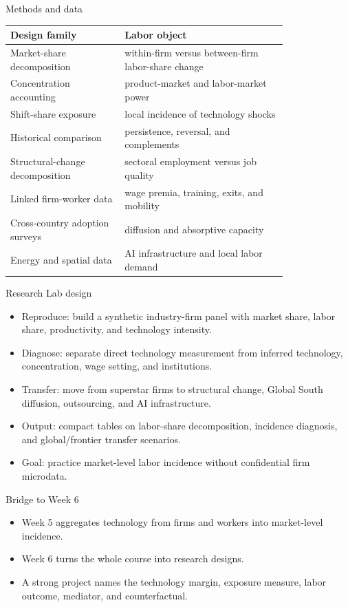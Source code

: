\documentclass[aspectratio=169,11pt]{beamer}
\begin{document}
\begin{frame}{Methods and data}
\small
\begin{tabular}{p{0.33\linewidth} p{0.47\linewidth}}
\toprule
Design family & Labor object \\
\midrule
Market-share decomposition & within-firm versus between-firm labor-share change \\
Concentration accounting & product-market and labor-market power \\
Shift-share exposure & local incidence of technology shocks \\
Historical comparison & persistence, reversal, and complements \\
Structural-change decomposition & sectoral employment versus job quality \\
Linked firm-worker data & wage premia, training, exits, and mobility \\
Cross-country adoption surveys & diffusion and absorptive capacity \\
Energy and spatial data & AI infrastructure and local labor demand \\
\bottomrule
\end{tabular}
\end{frame}

\begin{frame}{Research Lab design}
\begin{itemize}
    \item Reproduce: build a synthetic industry-firm panel with market share, labor share, productivity, and technology intensity.
    \item Diagnose: separate direct technology measurement from inferred technology, concentration, wage setting, and institutions.
    \item Transfer: move from superstar firms to structural change, Global South diffusion, outsourcing, and AI infrastructure.
    \item Output: compact tables on labor-share decomposition, incidence diagnosis, and global/frontier transfer scenarios.
    \item Goal: practice market-level labor incidence without confidential firm microdata.
\end{itemize}
\end{frame}

\begin{frame}{Bridge to Week 6}
\begin{itemize}
    \item Week 5 aggregates technology from firms and workers into market-level incidence.
    \item Week 6 turns the whole course into research designs.
    \item A strong project names the technology margin, exposure measure, labor outcome, mediator, and counterfactual.
\end{itemize}
\end{frame}
\end{document}

